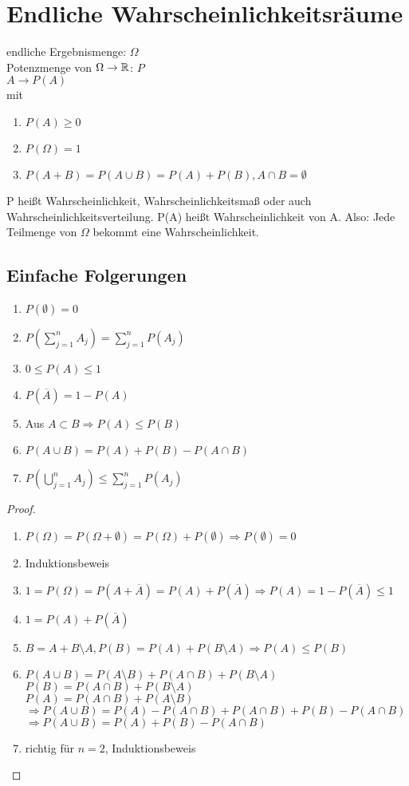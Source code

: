 \section{Endliche Wahrscheinlichkeitsräume}
endliche Ergebnismenge: $ \Omega $\\
Potenzmenge von $ \Omega \rightarrow \mathbb{R}$: $ P $\\
$ A \rightarrow P(A) $\\
mit
\begin{enumerate}
\item $ P(A)  \geq 0 $
\item $ P(\Omega) = 1 $
\item $ P(A+B)=P(A\cup B) = P(A) + P(B), A\cap B=\emptyset $
\end{enumerate}
P heißt Wahrscheinlichkeit, Wahrscheinlichkeitsmaß oder auch Wahrscheinlichkeitsverteilung. P(A) heißt Wahrscheinlichkeit von A. Also: Jede Teilmenge von $ \Omega $ bekommt eine Wahrscheinlichkeit. 

\subsection{Einfache Folgerungen}

\begin{enumerate}
\item $ P(\emptyset) = 0 $
\item $ P(\sum_{j=1}^{n} A_j) = \sum_{j=1}^{n} P(A_j) $ 
\item $ 0\leq P(A)\leq 1 $ 
\item $ P(\overline{A}) = 1-P(A) $ 
\item Aus $ A\subset B \Rightarrow P(A)\leq P(B) $ 
\item $ P(A\cup B) = P(A)+P(B) - P(A\cap B) $ 
\item $ P(\bigcup_{j=1}^n A_j) \leq \sum_{j=1}^{n} P(A_j) $ 
\end{enumerate}

\begin{proof}
\begin{enumerate}
\item $ P(\Omega)= P(\Omega + \emptyset) = P(\Omega) + P(\emptyset) \Rightarrow P(\emptyset) = 0 $ 
\item Induktionsbeweis 
\item $ 1 = P(\Omega) = P(A + \overline{A})= P(A) + P(\overline{A}) \Rightarrow P(A) = 1 - P(\overline{A}) \leq 1 $ 
\item $ 1= P(A) + P(\overline{A}) $ 
\item $ B=A+B \setminus A, P(B)=P(A) + P(B\setminus A) \Rightarrow P(A) \leq P(B) $ 
\item $ P(A\cup B)= P(A\setminus B) + P(A\cap B) + P(B\setminus A) $\\
	$ P(B) = P(A\cap B) + P(B\setminus A) $ \\
	$ P(A) = P(A\cap B) + P(A\setminus B) $\\
	$ \Rightarrow P(A\cup B) = P(A) - P(A\cap B) + P(A\cap B) + P(B) - P(A\cap B) $
	$ \Rightarrow P(A\cup B) = P(A) + P(B) - P(A\cap B) $
\item richtig für $ n=2 $, Induktionsbeweis 
\end{enumerate}
\end{proof}

